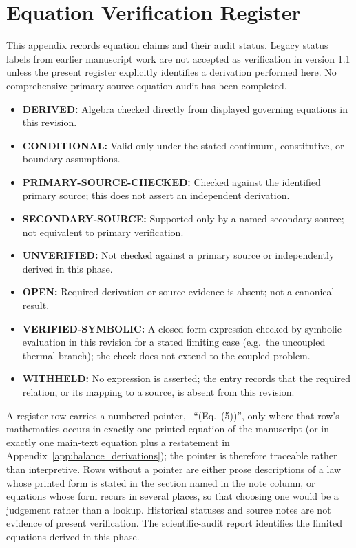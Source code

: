 \section{Equation Verification Register}
\label{app:equation_register}

This appendix records equation claims and their audit status. Legacy status labels from earlier manuscript work are not accepted as verification in version 1.1 unless the present register explicitly identifies a derivation performed here. No comprehensive primary-source equation audit has been completed.

\begin{itemize}
\item \textbf{DERIVED:} Algebra checked directly from displayed governing equations in this revision.
\item \textbf{CONDITIONAL:} Valid only under the stated continuum, constitutive, or boundary assumptions.
\item \textbf{PRIMARY-SOURCE-CHECKED:} Checked against the identified primary source; this does not assert an independent derivation.
\item \textbf{SECONDARY-SOURCE:} Supported only by a named secondary source; not equivalent to primary verification.
\item \textbf{UNVERIFIED:} Not checked against a primary source or independently derived in this phase.
\item \textbf{OPEN:} Required derivation or source evidence is absent; not a canonical result.
\item \textbf{VERIFIED-SYMBOLIC:} A closed-form expression checked by symbolic evaluation in this revision for a stated limiting case (e.g.\ the uncoupled thermal branch); the check does not extend to the coupled problem.
\item \textbf{WITHHELD:} No expression is asserted; the entry records that the required relation, or its mapping to a source, is absent from this revision.
\end{itemize}

A register row carries a numbered pointer, \eg\ ``(Eq.~(5))'', only where that row's mathematics occurs in exactly one printed equation of the manuscript (or in exactly one main-text equation plus a restatement in Appendix~\ref{app:balance_derivations}); the pointer is therefore traceable rather than interpretive. Rows without a pointer are either prose descriptions of a law whose printed form is stated in the section named in the note column, or equations whose form recurs in several places, so that choosing one would be a judgement rather than a lookup. Historical statuses and source notes are not evidence of present verification. The scientific-audit report identifies the limited equations derived in this phase.

